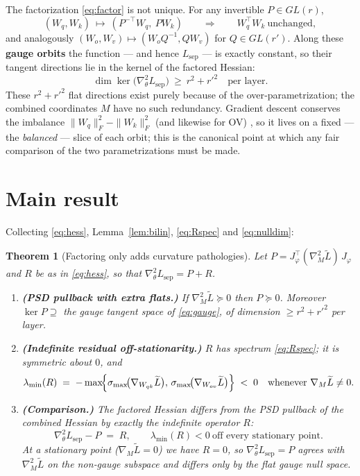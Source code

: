 \documentclass[11pt]{article}
\newtheorem{theorem}{Theorem}
\theoremstyle{remark}
\newcommand{\Wqk}{W_{qk}}
\newcommand{\Wov}{W_{ov}}
\newcommand{\Wq}{W_{q}}
\newcommand{\Wk}{W_{k}}
\newcommand{\Wo}{W_{o}}
\newcommand{\Wv}{W_{v}}
\newcommand{\Hess}{\nabla^2}
\begin{document}
The factorization \eqref{eq:factor} is not unique. For any invertible
$P\in GL(r)$,
\begin{equation}\label{eq:gauge}
(\Wq,\Wk)\ \longmapsto\ (P^{-\top}\Wq,\ P\Wk)
\qquad\Longrightarrow\qquad
\Wq^{\!\top}\Wk \ \text{unchanged},
\end{equation}
and analogously $(\Wo,\Wv)\mapsto(\Wo Q^{-1},Q\Wv)$ for $Q\in GL(r')$. Along these
\textbf{gauge orbits} the function --- and hence $L_{\mathrm{sep}}$ --- is exactly
constant, so their tangent directions lie in the kernel of the factored Hessian:
\begin{equation}\label{eq:nulldim}
\dim\ker\bigl(\Hess_\theta L_{\mathrm{sep}}\bigr)\ \ge\ r^2+r'^2 \quad\text{per layer.}
\end{equation}
These $r^2+r'^2$ flat directions exist purely because of the
over‑parametrization; the combined coordinates $M$ have no such redundancy.
Gradient descent conserves the imbalance $\|\Wq\|_F^2-\|\Wk\|_F^2$ (and likewise
for OV) \cite{DuHuLee2018}, so it lives on a fixed --- the \emph{balanced} ---
slice of each orbit; this is the canonical point at which any fair comparison of
the two parametrizations must be made.

\section{Main result}

Collecting \eqref{eq:hess}, Lemma~\ref{lem:bilin}, \eqref{eq:Rspec} and
\eqref{eq:nulldim}:

\begin{theorem}[Factoring only adds curvature pathologies]\label{thm:main}
Let $P=J_\varphi^{\!\top}(\Hess_M\widetilde L)\,J_\varphi$ and $R$ be as in
\eqref{eq:hess}, so that $\Hess_\theta L_{\mathrm{sep}}=P+R$.
\begin{enumerate}
\item[\textup{(a)}] \textbf{(PSD pullback with extra flats.)}
If $\Hess_M\widetilde L\succeq 0$ then $P\succeq 0$. Moreover
$\ker P\supseteq$ the gauge tangent space of \eqref{eq:gauge}, of dimension
$\ge r^2+r'^2$ per layer.
\item[\textup{(b)}] \textbf{(Indefinite residual off-stationarity.)}
$R$ has spectrum \eqref{eq:Rspec}; it is symmetric about $0$, and
\[
\lambda_{\min}(R)\;=\;-\max\!\Bigl\{\sigma_{\max}\!\bigl(\nabla_{\Wqk}\widetilde L\bigr),\,
                                      \sigma_{\max}\!\bigl(\nabla_{\Wov}\widetilde L\bigr)\Bigr\}\;<\;0
\quad\text{whenever }\nabla_M\widetilde L\neq 0 .
\]
\item[\textup{(c)}] \textbf{(Comparison.)} The factored Hessian differs from the
PSD pullback of the combined Hessian by exactly the indefinite operator $R$:
\[
\Hess_\theta L_{\mathrm{sep}} - P \;=\; R,\qquad
\lambda_{\min}(R)<0\ \text{off every stationary point.}
\]
At a stationary point ($\nabla_M\widetilde L=0$) we have $R=0$, so
$\Hess_\theta L_{\mathrm{sep}}=P$ agrees with $\Hess_M\widetilde L$ on the
non‑gauge subspace and differs only by the flat gauge null space.
\end{enumerate}
\end{theorem}
\end{document}
